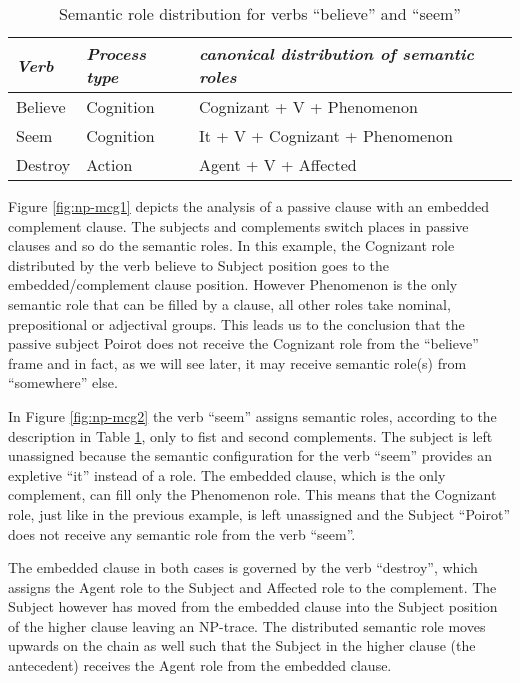     \begin{table}[!ht]
        \centering
        \begin{tabular}{|l|l|l|}
            \hline
            \textit{Verb} & \textit{Process type} & \textit{canonical distribution of semantic roles} \\ \hline
            Believe & Cognition & Cognizant + V + Phenomenon \\ \hline
            Seem & Cognition & It + V + Cognizant + Phenomenon \\ \hline
            Destroy & Action & Agent + V + Affected \\ \hline
        \end{tabular}
        \caption{Semantic role distribution for verbs ``believe'' and ``seem''}
        \label{tab:srl-for-example}
    \end{table}

    Figure \ref{fig:np-mcg1} depicts the analysis of a passive clause with an embedded complement clause. The subjects and complements switch places in passive clauses and so do the semantic roles. In this example, the Cognizant role distributed by the verb believe to Subject position goes to the embedded/complement clause position. However Phenomenon is the only semantic role that can be filled by a clause, all other roles take nominal, prepositional or adjectival groups. This leads us to the conclusion that the passive subject Poirot does not receive the Cognizant role from the ``believe'' frame and in fact, as we will see later, it may receive  semantic role(s) from ``somewhere'' else. 

    In Figure \ref{fig:np-mcg2} the verb ``seem'' assigns semantic roles, according to the description in Table \ref{tab:srl-for-example}, only to fist and second complements. The subject is left unassigned because the semantic configuration for the verb ``seem'' provides an expletive ``it'' instead of a role. The embedded clause, which is the only complement, can fill only the Phenomenon role. This means that the Cognizant role, just like in the previous example, is left unassigned and the Subject ``Poirot'' does not receive any semantic role from the verb ``seem''. 

    The embedded clause in both cases is governed by the verb ``destroy'', which assigns the Agent role to the Subject and Affected role to the complement. The Subject however has moved from the embedded clause into the Subject position of the higher clause leaving an NP-trace. The distributed semantic role moves upwards on the chain as well such that the Subject in the higher clause (the antecedent) receives the Agent role from the embedded clause. 

